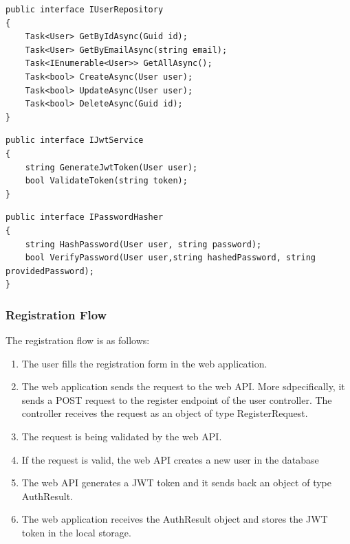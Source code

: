 \begin{lstlisting}[caption={User Repository interface}]
public interface IUserRepository
{
    Task<User> GetByIdAsync(Guid id);
    Task<User> GetByEmailAsync(string email);
    Task<IEnumerable<User>> GetAllAsync();
    Task<bool> CreateAsync(User user);
    Task<bool> UpdateAsync(User user);
    Task<bool> DeleteAsync(Guid id);
}
\end{lstlisting}

\begin{lstlisting}[caption={JWT Service interface}]
public interface IJwtService
{
    string GenerateJwtToken(User user);
    bool ValidateToken(string token);
}
\end{lstlisting}

\begin{lstlisting}[caption={Password Hasher interface}]
public interface IPasswordHasher
{
    string HashPassword(User user, string password);
    bool VerifyPassword(User user,string hashedPassword, string providedPassword);
}
\end{lstlisting}

\subsubsection{Registration Flow}
The registration flow is as follows:
\begin{enumerate}
    \item The user fills the registration form in the web application.
    \item The web application sends the request to the web API. More sdpecifically, 
    it sends a POST request to the register endpoint of the user controller. The controller
    receives the request as an object of type RegisterRequest.
    \item The request is being validated by the web API.
    \item If the request is valid, the web API creates a new user in the database
    \item The web API generates a JWT token and it sends back an object of type AuthResult.
    \item The web application receives the AuthResult object and stores the JWT token in the local storage.
\end{enumerate}

